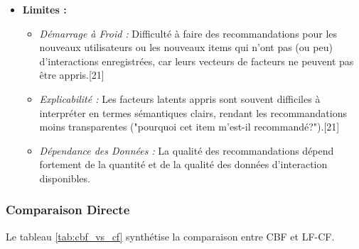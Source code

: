 \documentclass[11pt,a4paper]{article}
\begin{document}
\begin{itemize}
\begin{itemize}
            \item \textit{Sérendipité :} Capable de découvrir des associations latentes et de recommander des items inattendus mais pertinents, allant au-delà des similarités évidentes de contenu.
            \item \textit{Pas besoin de contenu :} Ne nécessite pas d'informations descriptives sur les items.
        \end{itemize}
    \item \textbf{Limites :}
        \begin{itemize}
            \item \textit{Démarrage à Froid :} Difficulté à faire des recommandations pour les nouveaux utilisateurs ou les nouveaux items qui n'ont pas (ou peu) d'interactions enregistrées, car leurs vecteurs de facteurs ne peuvent pas être appris.[21]
            \item \textit{Explicabilité :} Les facteurs latents appris sont souvent difficiles à interpréter en termes sémantiques clairs, rendant les recommandations moins transparentes ("pourquoi cet item m'est-il recommandé?").[21]
            \item \textit{Dépendance des Données :} La qualité des recommandations dépend fortement de la quantité et de la qualité des données d'interaction disponibles.
        \end{itemize}
\end{itemize}

\subsubsection{Comparaison Directe}

Le tableau \ref{tab:cbf_vs_cf} synthétise la comparaison entre CBF et LF-CF.
\end{document}
